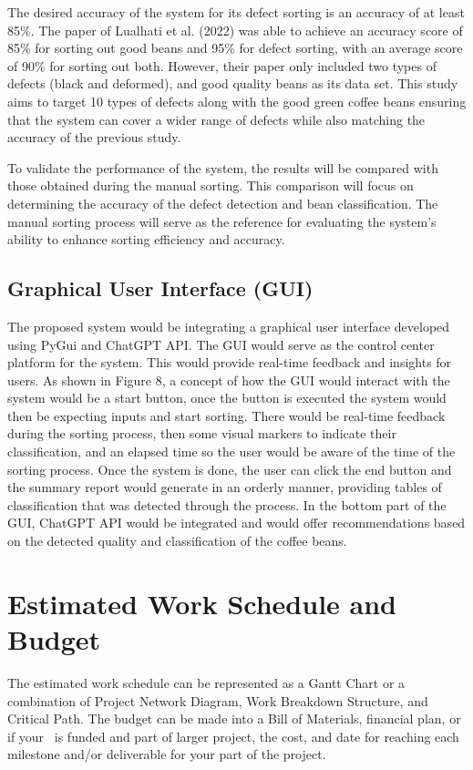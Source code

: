 The desired accuracy of the system for its defect sorting is an accuracy of at least 85\%. The paper of Lualhati et al. (2022) was able to achieve an accuracy score of 85\% for sorting out good beans and 95\% for defect sorting, with an average score of 90\% for sorting out both. However, their paper only included two types of defects (black and deformed), and good quality beans as its data set. This study aims to target 10 types of defects along with the good green coffee beans ensuring that the system can cover a wider range of defects while also matching the accuracy of the previous study. 

To validate the performance of the system, the results will be compared with those obtained during the manual sorting. This comparison will focus on determining the accuracy of the defect detection and bean classification. The manual sorting process will serve as the reference for evaluating the system’s ability to enhance sorting efficiency and accuracy.

\subsection{Graphical User Interface (GUI)}
The proposed system would be integrating a graphical user interface developed using PyGui and ChatGPT API. The GUI would serve as the control center platform for the system. This would provide real-time feedback and insights for users. As shown in Figure 8, a concept of how the GUI would interact with the system would be a start button, once the button is executed the system would then be expecting inputs and start sorting. There would be real-time feedback during the sorting process, then some visual markers to indicate their classification, and an elapsed time so the user would be aware of the time of the sorting process. Once the system is done, the user can click the end button and the summary report would generate in an orderly manner, providing tables of classification that was detected through the process. In the bottom part of the GUI, ChatGPT API would be integrated and would offer recommendations based on the detected quality and classification of the coffee beans. 

\ifFinished
\else

\section{Estimated Work Schedule and Budget}

The estimated work schedule can be represented as a Gantt Chart or a combination of Project Network Diagram, Work Breakdown Structure, and Critical Path.  The budget can be made into a Bill of Materials, financial plan, or if your \documentType \ is funded and part of larger project, the cost, and date for reaching each milestone and/or deliverable for your part of the project.

